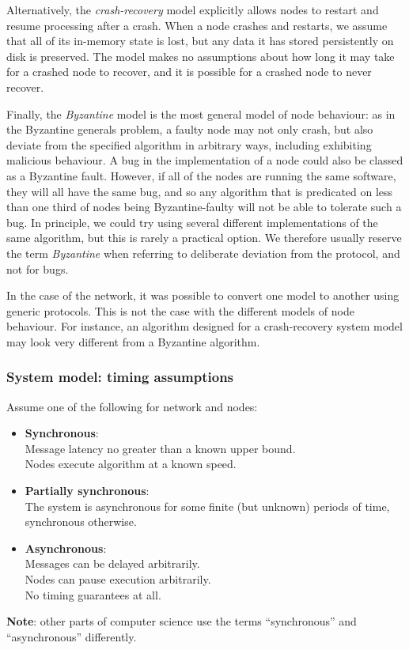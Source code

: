 Alternatively, the \emph{crash-recovery} model explicitly allows nodes to restart and resume processing after a crash.
When a node crashes and restarts, we assume that all of its in-memory state is lost, but any data it has stored persistently on disk is preserved.
The model makes no assumptions about how long it may take for a crashed node to recover, and it is possible for a crashed node to never recover.

Finally, the \emph{Byzantine} model is the most general model of node behaviour: as in the Byzantine generals problem, a faulty node may not only crash, but also deviate from the specified algorithm in arbitrary ways, including exhibiting malicious behaviour.
A bug in the implementation of a node could also be classed as a Byzantine fault.
However, if all of the nodes are running the same software, they will all have the same bug, and so any algorithm that is predicated on less than one third of nodes being Byzantine-faulty will not be able to tolerate such a bug.
In principle, we could try using several different implementations of the same algorithm, but this is rarely a practical option.
We therefore usually reserve the term \emph{Byzantine} when referring to deliberate deviation from the protocol, and not for bugs.

In the case of the network, it was possible to convert one model to another using generic protocols.
This is not the case with the different models of node behaviour.
For instance, an algorithm designed for a crash-recovery system model may look very different from a Byzantine algorithm.

\begin{frame}
    \label{s:model-synchrony}
    \frametitle{System model: timing assumptions}
    Assume one of the following for network and nodes:
    \begin{itemize}
        \item \textbf{Synchronous}:\\
            Message latency no greater than a known upper bound.\\
            Nodes execute algorithm at a known speed.\pause
        \item \textbf{Partially synchronous}:\\
            The system is asynchronous for some finite (but unknown) periods of time, synchronous otherwise.\pause
        \item \textbf{Asynchronous}:\\
            Messages can be delayed arbitrarily.\\
            Nodes can pause execution arbitrarily.\\
            No timing guarantees at all.\\[1em]
    \end{itemize}
    \textbf{Note}: other parts of computer science use the terms ``synchronous'' and ``asynchronous'' differently.
\end{frame}
\label{l:model-synchrony}

